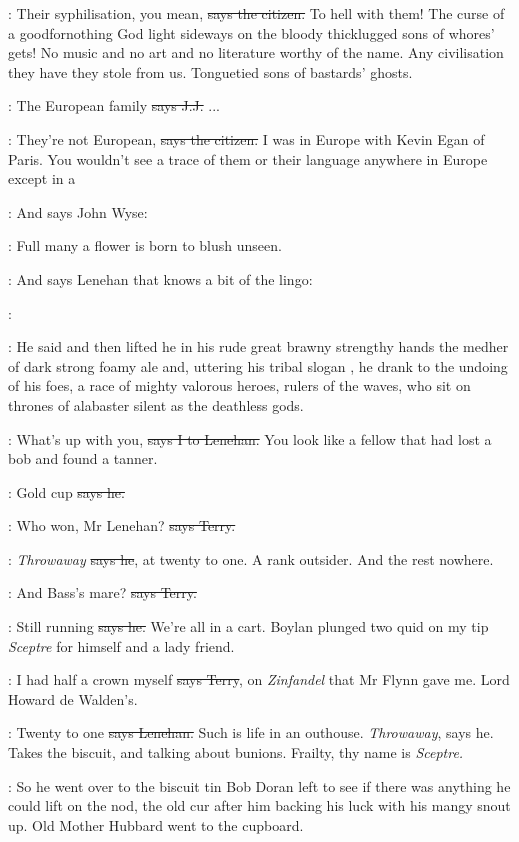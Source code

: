 \citizen:
Their syphilisation,
you mean,
\sout{says the citizen.}
To hell with them!
The
curse of a goodfornothing God light sideways on the bloody thicklugged
sons of whores' gets!
No music and no art and no literature worthy of the
name.
Any civilisation they have they stole from us.
Tonguetied sons of
bastards' ghosts.

\jjom:
The European family
\sout{says J.J.} ...

\citizen:
They're not European,
\sout{says the citizen.}
I was in Europe with Kevin Egan
of Paris.
You wouldn't see a trace of them or their language anywhere in
Europe except in a 

\Nq:
And says John Wyse:

\johnwyse:
Full many a flower is born to blush unseen.

\Nq:
And says Lenehan that knows a bit of the lingo:

\lenehan:

:
He said and then lifted he
in his rude great brawny strengthy hands
the medher of dark strong foamy ale and,
uttering his tribal slogan ,
he drank to the undoing of his foes,
a race of mighty valorous
heroes,
rulers of the waves,
who sit on thrones of alabaster silent as the
deathless gods.

:
What's up with you,
\sout{says I to Lenehan.}
You look like a fellow that had
lost a bob and found a tanner.

\lenehan:
Gold cup
\sout{says he.}

\terry:
Who won,
Mr Lenehan?
\sout{says Terry.}

\lenehan:
\emph{Throwaway}
\sout{says he},
at twenty to one.
A rank outsider.
And the rest
nowhere.%

\terry:
And Bass's mare?
\sout{says Terry.}

\lenehan:
Still running
\sout{says he.}
We're all in a cart.
Boylan plunged two quid on
my tip \emph{Sceptre} for himself and a lady friend.

\terry:
I had half a crown myself
\sout{says Terry},
on \emph{Zinfandel} that Mr Flynn gave
me.
Lord Howard de Walden's.

\lenehan:
Twenty to one
\sout{says Lenehan.}
Such is life in an outhouse.
\emph{Throwaway},
says he.
Takes the biscuit,
and talking about bunions.
Frailty,
thy name
is \emph{Sceptre.}

\Nq:
So he went over to the biscuit tin Bob Doran left to see if there was
anything he could lift on the nod,
the old cur after him backing his luck
with his mangy snout up.
Old Mother Hubbard went to the cupboard.


